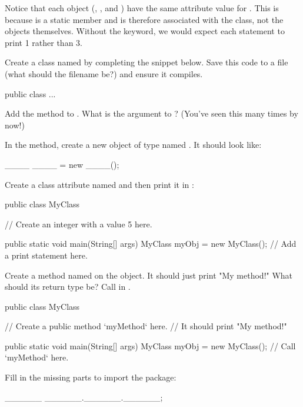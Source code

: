 Notice that each  object (, , and ) have the same attribute value for . This is because  is a static member and is therefore associated with the class, not the objects themselves. Without the  keyword, we would expect each  statement to print 1 rather than 3.

\exercisesection

\begin{exercise}
Create a class named  by completing the snippet below.  Save this code to a file (what should the filename be?) and ensure it compiles.

\begin{code}
public class ...
\end{code}
\end{exercise}

\begin{exercise}
Add the  method to . What is the argument to ? (You've seen this many times by now!)
\end{exercise}

\begin{exercise}
In the  method, create a new object of type  named . It should look like:

\begin{code}
____ ____ = new ____();
\end{code}
\end{exercise}

\begin{exercise}
Create a class attribute named  and then print it in :

\begin{code}
public class MyClass {
  
  // Create an integer with a value 5 here.

  public static void main(String[] args) {
    MyClass myObj = new MyClass();
    // Add a print statement here.
  }
}
\end{code}
\end{exercise}

\begin{exercise}
Create a method named  on the object. It should just print "My method!" What should its return type be? Call  in .

\begin{code}
public class MyClass {
  
  // Create a public method `myMethod` here.
  // It should print "My method!"

  public static void main(String[] args) {
    MyClass myObj = new MyClass();
    // Call `myMethod` here.
  }
}
\end{code}
\end{exercise}

\begin{exercise}
Fill in the missing parts to import the  package:

\begin{monospace}
______ ______.______.______;
\end{monospace}
\end{exercise}